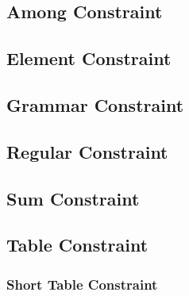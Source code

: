\documentclass[../Document.tex]{subfiles}
\begin{document}
\subsection{Among Constraint}

\subsection{Element Constraint}

\subsection{Grammar Constraint}

\subsection{Regular Constraint}

\subsection{Sum Constraint}

\subsection{Table Constraint}
\subsubsection{Short Table Constraint}
\end{document}
